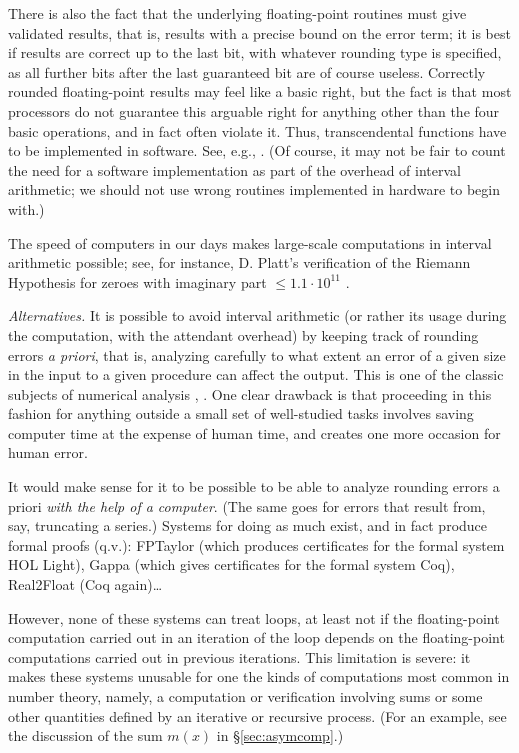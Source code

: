   There is also the fact
  that the underlying floating-point routines must give validated results,
  that is, results with a precise bound on the error term; it is best if
  results are correct up to the last bit, with whatever rounding type
  is specified, as all further bits after the last guaranteed bit are of course
  useless. Correctly rounded floating-point results may feel like a basic
  right, but the fact is that most processors do not guarantee this
  arguable right
  for anything other than the four basic operations,
  and in fact often violate it.
  Thus, transcendental functions have to be implemented in software. See, e.g.,
  \cite{crlibm}. (Of course, it may not be fair to count the need for
  a software implementation as part of the overhead of interval arithmetic;
  we should not use wrong routines implemented in hardware to begin with.)
  
  The speed of computers in our days makes large-scale computations in interval
  arithmetic possible; see, for instance,
  D. Platt's verification of the Riemann Hypothesis for zeroes with imaginary
  part $\leq 1.1\cdot 10^{11}$ \cite{Platt}.

  {\em Alternatives.}  It is possible to avoid interval arithmetic (or rather its usage during the computation, with the attendant
  overhead) by keeping
  track of rounding errors {\em a priori}, that is,
  analyzing carefully to what extent an error of a given size
  in the input to a given procedure can affect the output.
  This is one of the classic subjects of numerical analysis
  \cite{Wilkinson}, \cite{Higham}.
  One clear drawback is that proceeding in this fashion for anything
  outside a small set of well-studied tasks involves saving computer time at the
  expense of human time, and creates one more occasion for human error.

  It would make sense for it to be possible to be able to analyze rounding
  errors a priori {\em with the help of a computer}. (The same goes
  for errors that result from, say, truncating a series.) Systems for doing
  as much exist, and in fact produce formal proofs (q.v.): FPTaylor
  (which produces certificates for the formal system HOL Light),
  Gappa (which gives certificates for the formal system Coq), Real2Float
  (Coq again)\dots

  However, none of these systems can treat loops, at least not if the
  floating-point computation carried out in an iteration of the loop
  depends on the floating-point computations carried out in previous iterations.
  This
  limitation is severe: it makes these systems unusable for one the kinds of computations
  most common in number theory, namely, a computation or verification involving
  sums or some other quantities defined by an iterative or recursive process.
  (For an example, see the discussion of the sum $m(x)$ in \S \ref{sec:asymcomp}.)
  
